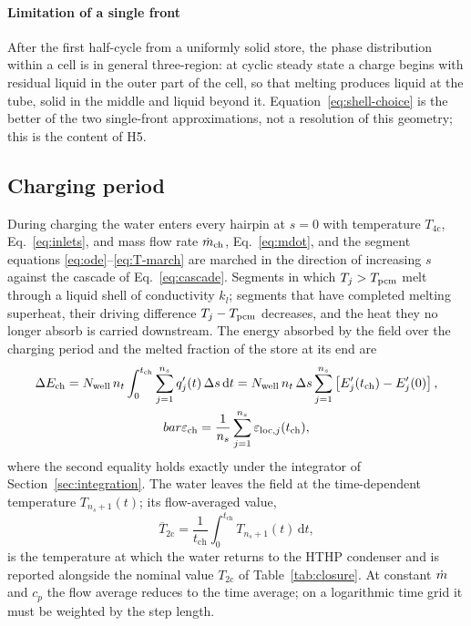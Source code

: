 \paragraph{Limitation of a single front} After the first half-cycle from a
uniformly solid store, the phase distribution within a cell is in general
three-region: at cyclic steady state a charge begins with residual liquid in
the outer part of the cell, so that melting produces liquid at the tube, solid
in the middle and liquid beyond it. Equation~\eqref{eq:shell-choice} is the
better of the two single-front approximations, not a resolution of this
geometry; this is the content of H5.

\subsection{Charging period}
\label{sec:BB_ch}

During charging the water enters every hairpin at $s=0$ with temperature
$T_\mathrm{4c}$, Eq.~\eqref{eq:inlets}, and mass flow rate $\dot m_\mathrm{ch}$,
Eq.~\eqref{eq:mdot}, and the segment equations
\eqref{eq:ode}--\eqref{eq:T-march} are marched in the direction of increasing
$s$ against the cascade of Eq.~\eqref{eq:cascade}. Segments in which
$T_j>T_{\mathrm{pcm}}$ melt through a liquid shell of conductivity $k_l$; segments that
have completed melting superheat, their driving difference $T_j-T_{\mathrm{pcm}}$
decreases, and the heat they no longer absorb is carried downstream. The
energy absorbed by the field over the charging period and the melted fraction
of the store at its end are
\begin{gather}
  \Delta E_\mathrm{ch}=N_{\mathrm{well}}\,n_t\int_{0}^{t_\mathrm{ch}}\sum_{j=1}^{n_s}
     q'_j(t)\,\Delta s\,\mathrm{d}t
   =N_{\mathrm{well}}\,n_t\,\Delta s\sum_{j=1}^{n_s}\left[E'_j(t_\mathrm{ch})-E'_j(0)\right],
  \label{eq:Ech}\\
  bar\varepsilon_\mathrm{ch}=\frac1{n_s}\sum_{j=1}^{n_s}
     \varepsilon_{\mathrm{loc},j}(t_\mathrm{ch}),
  \label{eq:eps-ch}
\end{gather}
where the second equality holds exactly under the integrator of
Section~\ref{sec:integration}. The water leaves the field at the
time-dependent temperature $T_{n_s+1}(t)$; its flow-averaged value,
\begin{equation}
  \overline{T}_\mathrm{2c}=\frac{1}{t_\mathrm{ch}}\int_{0}^{t_\mathrm{ch}}
     T_{n_s+1}(t)\,\mathrm{d}t,
  \label{eq:Tout-mean}
\end{equation}
is the temperature at which the water returns to the HTHP condenser and is
reported alongside the nominal value $T_\mathrm{2c}$ of
Table~\ref{tab:closure}. At constant $\dot m$ and $c_p$ the flow average reduces
to the time average; on a logarithmic time grid it must be weighted by the
step length.

